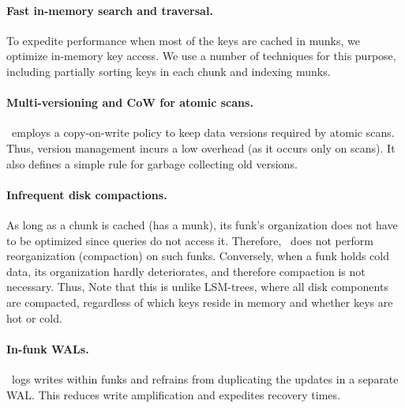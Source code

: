 \paragraph{Fast in-memory search and traversal.} To expedite performance when 
most of the keys are cached in munks, 
we  optimize in-memory key access. We use a number of techniques for this purpose, including partially sorting keys in each chunk and 
indexing munks.
\paragraph{Multi-versioning and CoW for atomic scans.} \sys\ employs a copy-on-write policy to keep data versions required by atomic scans.
Thus, version management incurs a low overhead (as it occurs only on scans). It also defines a simple rule for garbage collecting old versions.
\paragraph{Infrequent disk compactions.} 
As long as a chunk is cached (has a munk), its funk's organization does not have to be optimized since 
queries do not access it. Therefore, \sys\ does not perform reorganization (compaction) on such funks.
Conversely, when a funk holds cold data, its organization hardly deteriorates, and therefore compaction is not necessary.
Thus,  
Note that this is unlike LSM-trees, where all disk components are compacted, regardless of which keys reside in memory and whether 
keys are hot or cold. 

\paragraph{In-funk WALs.} \sys\ logs writes within funks and refrains from duplicating the updates  in a separate WAL. This reduces write amplification and expedites recovery times. 
